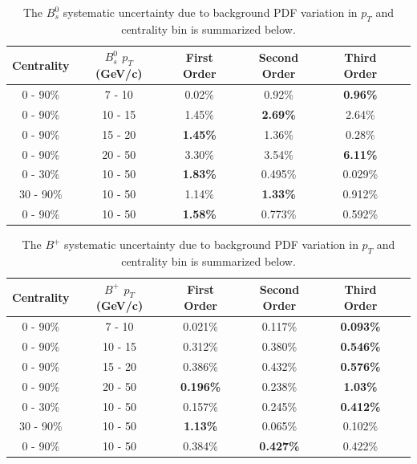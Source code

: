 \begin{table}[h]
\begin{center}
\caption{The $B^0_s$ systematic uncertainty due to background PDF variation in $p_T$ and centrality bin is summarized below.}
\vspace{1em}
\label{BsPTShape}
  \begin{tabular}{| c | c |c | c| c| c| }
    \hline
     Centrality & $B^0_s$ $p_T$ (GeV/c) & First Order & Second Order  &  Third Order \\
    \hline
    \hline
0 - 90\% & 7 - 10 &   0.02\%  &  0.92\% & \textbf{0.96\%}  \\ 
0 - 90\% & 10 - 15 & 1.45\%  & \textbf{2.69\%}  & 2.64\% \\ 
0 - 90\% & 15 - 20 &  \textbf{1.45\% }  & 1.36\%   &  0.28\%\\ 
0 - 90\% & 20 - 50 &  3.30\%   & 3.54\%  &  \textbf{6.11\%}  \\ 
0 - 30\% & 10 - 50  & \textbf{1.83\%}  & 0.495\%  &0.029\%  \\ 
30 - 90\% & 10 - 50 &  1.14\% &   \textbf{1.33\%}  & 0.912\% \\ 
0 - 90\% & 10 - 50 &  \textbf{1.58\%}   & 0.773\%  & 0.592\% \\ 
    \hline
    \hline
\end{tabular}
\end{center}
\end{table}



\begin{table}[h]
\begin{center}
\caption{The $B^+$ systematic uncertainty due to background PDF variation in $p_T$ and centrality bin is summarized below.}
\vspace{1em}
\label{BsPTShape}
  \begin{tabular}{| c | c |c | c| c| c| }
    \hline
     Centrality & $B^+$ $p_T$ (GeV/c) & First Order & Second Order  &  Third Order \\
    \hline
    \hline
0 - 90\% & 7 - 10 &   0.021\%  &  0.117\% & \textbf{0.093\%} \\ 
0 - 90\% & 10 - 15 & 0.312\%  & 0.380\%  & \textbf{0.546\%} \\ 
0 - 90\% & 15 - 20 &  0.386\% & 0.432\%   &  \textbf{0.576\%} \\ 
0 - 90\% & 20 - 50 &  \textbf{0.196\% }   & 0.238\%  &  \textbf{1.03\%} \\ 
0 - 30\% & 10 - 50  & 0.157\%  & 0.245\%  & \textbf{0.412\%}  \\ 
30 - 90\% & 10 - 50 &  \textbf{1.13\%} &   0.065\%  & 0.102\% \\ 
0 - 90\% & 10 - 50 &  0.384\%   & \textbf{0.427\%}  & 0.422\% \\ 
    \hline
    \hline
\end{tabular}
\end{center}
\end{table}



